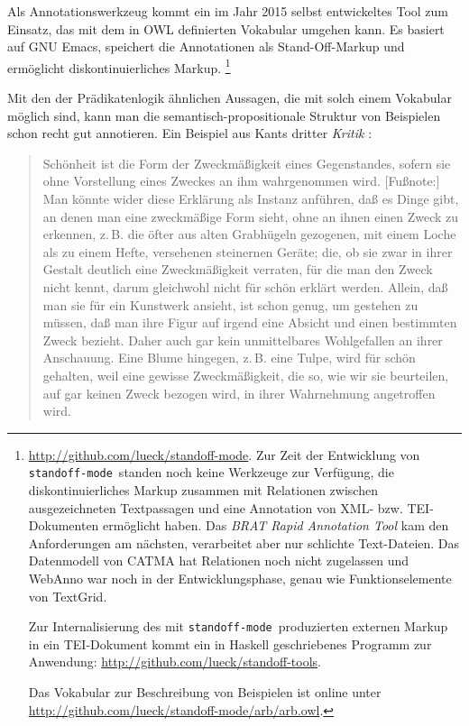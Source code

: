\documentclass{article}
\newcommand*{\lit}{\textit}%
\newcommand*{\englisch}[1]{\foreignlanguage{english}{\textit{#1}}}%
\newcommand*{\som}{\texttt{standoff-mode}}%
\begin{document}
Als Annotationswerkzeug kommt ein im Jahr 2015 selbst entwickeltes
Tool zum Einsatz, das mit dem in OWL definierten Vokabular umgehen
kann. Es basiert auf GNU Emacs, speichert die Annotationen als
Stand-Off-Markup und ermöglicht diskontinuierliches Markup.%
\footnote{\url{http://github.com/lueck/standoff-mode}. Zur Zeit der
  Entwicklung von \som\ standen noch keine Werkzeuge zur Verfügung,
  die diskontinuierliches Markup zusammen mit Relationen zwischen
  ausgezeichneten Textpassagen und eine Annotation von XML-
  bzw. TEI-Dokumenten ermöglicht haben. Das \englisch{BRAT Rapid
    Annotation Tool} kam den Anforderungen am nächsten, verarbeitet
  aber nur schlichte Text-Dateien. Das Datenmodell von CATMA hat
  Relationen noch nicht zugelassen und WebAnno war noch in der
  Entwicklungsphase, genau wie Funktionselemente von TextGrid.\par
  Zur Internalisierung des mit \som\ produzierten externen Markup in
  ein TEI-Dokument kommt ein in Haskell geschriebenes Programm zur
  Anwendung: \url{http://github.com/lueck/standoff-tools}.\par
  Das Vokabular zur Beschreibung von Beispielen ist online unter
  \url{http://github.com/lueck/standoff-mode/arb/arb.owl}.} %

Mit den der Prädikatenlogik ähnlichen Aussagen, die mit solch einem
Vokabular möglich sind, kann man die semantisch-propositionale
Struktur von Beispielen schon recht gut annotieren. Ein Beispiel aus
Kants dritter \lit{Kritik} \parencite[\pno\,77\psq (§\,17)]{KantKdU}:

\begin{quote}
  Schönheit ist die Form der Zweckmäßigkeit eines Gegenstandes, sofern
  sie ohne Vorstellung eines Zweckes an ihm wahrgenommen
  wird. [Fußnote:] Man könnte wider diese Erklärung als Instanz
  anführen, daß es Dinge gibt, an denen man eine zweckmäßige Form
  sieht, ohne an ihnen einen Zweck zu erkennen, z.\,B. die öfter aus
  alten Grabhügeln gezogenen, mit einem Loche als zu einem Hefte,
  versehenen steinernen Geräte; die, ob sie zwar in ihrer Gestalt
  deutlich eine Zweckmäßigkeit verraten, für die man den Zweck nicht
  kennt, darum gleichwohl nicht für schön erklärt werden. Allein, daß
  man sie für ein Kunstwerk ansieht, ist schon genug, um gestehen zu
  müssen, daß man ihre Figur auf irgend eine Absicht und einen
  bestimmten Zweck bezieht. Daher auch gar kein unmittelbares
  Wohlgefallen an ihrer Anschauung. Eine Blume hingegen, z.\,B. eine
  Tulpe, wird für schön gehalten, weil eine gewisse Zweckmäßigkeit,
  die so, wie wir sie beurteilen, auf gar keinen Zweck bezogen wird,
  in ihrer Wahrnehmung angetroffen wird.
\end{quote}
\end{document}
